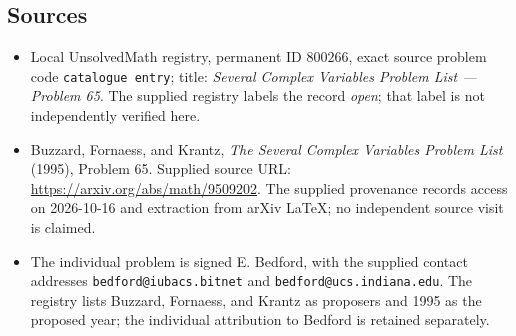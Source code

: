 \documentclass[11pt]{article}
\begin{document}
\subsection{Sources}
\begin{itemize}
\item Local UnsolvedMath registry, permanent ID \(800266\), exact source problem code \texttt{catalogue entry}; title: \emph{Several Complex Variables Problem List --- Problem 65}. The supplied registry labels the record \emph{open}; that label is not independently verified here.
\item Buzzard, Fornaess, and Krantz, \emph{The Several Complex Variables Problem List} (1995), Problem 65. Supplied source URL: \url{https://arxiv.org/abs/math/9509202}. The supplied provenance records access on 2026-10-16 and extraction from arXiv LaTeX; no independent source visit is claimed.
\item The individual problem is signed E. Bedford, with the supplied contact addresses \texttt{bedford@iubacs.bitnet} and \texttt{bedford@ucs.indiana.edu}. The registry lists Buzzard, Fornaess, and Krantz as proposers and 1995 as the proposed year; the individual attribution to Bedford is retained separately.
\end{itemize}
\end{document}
